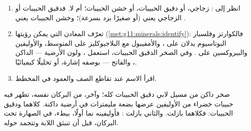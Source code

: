 
\begin{method}\label{met:g11:igneous-rocks:naming}
\begin{enumerate}
  \item انظر إلى : زجاجي، أو دقيق الحبيبات، أو خشن الحبيبات؛
         أم لا. فدقيق الحبيبات أو الزجاجي يعني  (أو
         صغيرًا برد بسرعة)؛ وخشن الحبيبات يعني .
  \item تعرّف المعادن التي يمكن رؤيتها
        (\cref{met:g11:minerals:identify}): فالكوارتز وفلسبار البوتاسيوم
        يدلان على ، والأمفيبول مع البلاجيوكليز على المتوسط، والأوليفين
        والبيروكسين على . وفي الصخر الدقيق الحبيبات، استعمل ،
        ولون الأرضية --- الداكن ، والفاتح  ---
        بوصفه إشارة، أو تحليلًا كيميائيًا.
  \item اقرأ الاسم عند تقاطع الصف والعمود في
        المخطط.
\end{enumerate}
\end{method}

\begin{example}[بازلتان]
صخر داكن من مسيل لابي دقيق الحبيبات كله؛ وآخر، من
البركان نفسه، تظهر فيه حبيبات خضراء من الأوليفين عرضها بضعة مليمترات في
أرضية داكنة. كلاهما  ودقيق الحبيبات: فكلاهما بازلت.
والثاني بازلت : فأوليفينه نما أولًا، ببطء، في
الصهارة تحت البركان، قبل أن تنبثق اللابة وتتجمد حوله.
\end{example}

